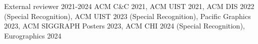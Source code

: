 

\begin{cventries}



 \cventry
  	{External reviewer} %
    {2021-2024} %
    {ACM C\&C 2021, ACM UIST 2021, ACM DIS 2022 (Special Recognition), ACM UIST 2023 (Special Recognition), Pacific Graphics 2023, ACM SIGGRAPH Posters 2023, ACM CHI 2024 (Special Recognition), Eurographics 2024}



\end{cventries}
